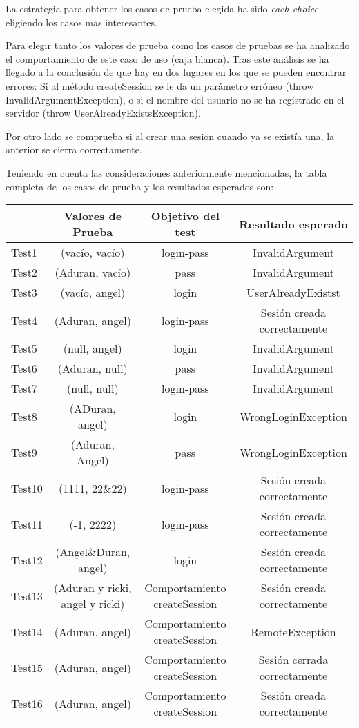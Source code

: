 La estrategia para obtener los casos de prueba elegida ha sido
\textit{each choice} eligiendo los casos mas interesantes.

Para elegir tanto los valores de prueba como los casos de pruebas se ha analizado el comportamiento de este caso de uso (caja blanca). Tras este análisis se ha llegado a la conclusión de que hay en dos lugares en los que se pueden encontrar errores: Si al método createSession se le da un parámetro erróneo (throw InvalidArgumentException), o si el nombre del usuario no se ha registrado en el servidor (throw UserAlreadyExistsException).

Por otro lado se comprueba si al crear una sesion cuando ya se existía una, la anterior se cierra correctamente.


Teniendo en cuenta las consideraciones anteriormente mencionadas, la tabla completa de los casos de prueba y los resultados esperados son:

{\footnotesize
\begin{longtable}[c]{lccc}
 & \textbf{Valores de Prueba} & \textbf{Objetivo del test} & \textbf{Resultado esperado} \\
\hline \hline
\endhead

Test1 & (vacío, vacío)  & login-pass & InvalidArgument\\
Test2 & (Aduran, vacío) & pass & InvalidArgument\\
Test3 & (vacío, angel) & login & UserAlreadyExistst\\
Test4 & (Aduran, angel) & login-pass   & Sesión creada correctamente\\
Test5 & (null, angel) & login   & InvalidArgument\\
Test6 & (Aduran, null) & pass   & InvalidArgument\\
Test7 & (null, null) & login-pass   & InvalidArgument\\
Test8 & (ADuran, angel) & login & WrongLoginException\\
Test9 & (Aduran, Angel) & pass & WrongLoginException\\
Test10 & (1111, 22\&22) & login-pass & Sesión creada correctamente\\
Test11& (-1, 2222) & login-pass  & Sesión creada correctamente\\
Test12& (Angel\&Duran, angel) & login  &  Sesión creada correctamente \\
Test13 & (Aduran y ricki, angel y ricki) & Comportamiento createSession & Sesión creada correctamente\\
Test14 & (Aduran, angel) & Comportamiento createSession & RemoteException\\
Test15 & (Aduran, angel) & Comportamiento createSession & Sesión cerrada correctamente\\
Test16 & (Aduran, angel) & Comportamiento createSession & Sesión creada correctamente\\

\hline
\end{longtable}
}

